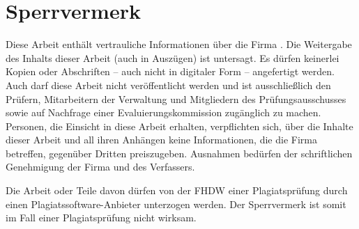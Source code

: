 \clearpage
{}
{}

\section*{Sperrvermerk}

Diese Arbeit enthält vertrauliche Informationen über die Firma \koorperationsunternehmen.
Die Weitergabe des Inhalts dieser Arbeit (auch in Auszügen) ist untersagt.
Es dürfen keinerlei Kopien oder Abschriften -- auch nicht in digitaler Form -- angefertigt werden.
Auch darf diese Arbeit nicht veröffentlicht werden und ist ausschließlich den Prüfern,
Mitarbeitern der Verwaltung und Mitgliedern des Prüfungsausschusses sowie auf Nachfrage
einer Evaluierungskommission zugänglich zu machen.
Personen, die Einsicht in diese Arbeit erhalten, verpflichten sich, über die Inhalte dieser
Arbeit und all ihren Anhängen keine Informationen, die die Firma \koorperationsunternehmen{}
betreffen, gegenüber Dritten preiszugeben.
Ausnahmen bedürfen der schriftlichen Genehmigung der Firma \koorperationsunternehmen{}
und des Verfassers.

\vspace{4mm}

Die Arbeit oder Teile davon dürfen von der FHDW einer Plagiatsprüfung durch einen
Plagiatssoftware-Anbieter unterzogen werden. Der Sperrvermerk ist somit im Fall einer
Plagiatsprüfung nicht wirksam.
